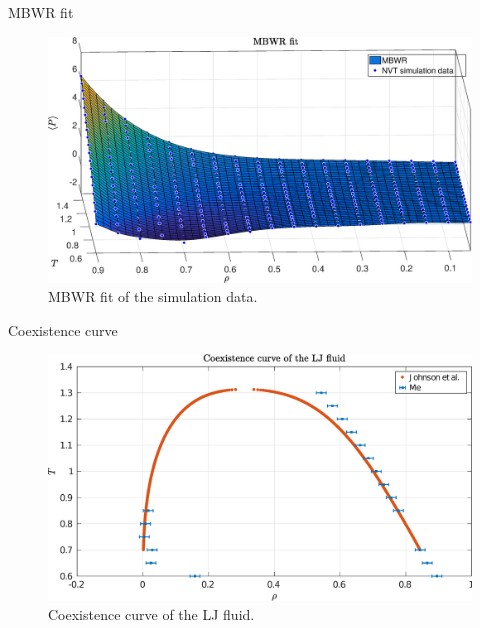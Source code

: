 \documentclass[10pt, compress, protectframetitle, handout]{beamer}
\begin{document}
\begin{frame}{MBWR fit}

	\begin{figure}
		\centering
		\includegraphics[width=\textwidth]{MBWR_fit}
		\caption{MBWR fit of the simulation data.}
		\label{fig:MBWR_fit}
	\end{figure}

\end{frame}

\begin{frame}{Coexistence curve}

	\begin{figure}
		\centering
		\includegraphics[width=\textwidth]{Coexistence}
		\caption{Coexistence curve of the LJ fluid.}
		\label{fig:coexistence}
	\end{figure}

\end{frame}
\end{document}
